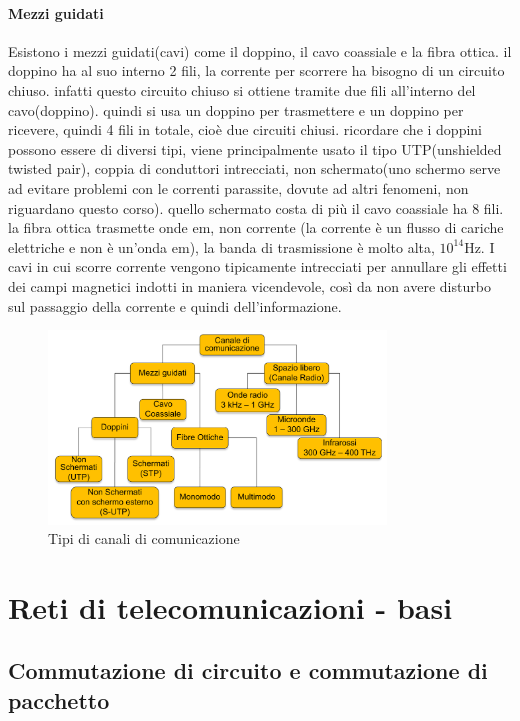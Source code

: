 \paragraph{Mezzi guidati}
Esistono i mezzi guidati(cavi) come il doppino, il cavo coassiale e la fibra ottica.
il doppino ha al suo interno 2 fili, la corrente per scorrere ha bisogno di un circuito chiuso. infatti questo circuito chiuso si ottiene tramite due fili all’interno del cavo(doppino).
quindi si usa un doppino per trasmettere e un doppino per ricevere, quindi 4 fili in totale, cioè due circuiti chiusi. ricordare che i doppini possono essere di diversi tipi, viene principalmente usato il tipo UTP(unshielded twisted pair), coppia di conduttori intrecciati, non schermato(uno schermo serve ad evitare problemi con le correnti parassite, dovute ad altri fenomeni, non riguardano questo corso). quello schermato costa di più
il cavo coassiale ha 8 fili.
la fibra ottica trasmette onde em, non corrente (la corrente è un flusso di cariche elettriche e non è un'onda em), la banda di trasmissione è molto alta, $10^{14}$Hz.
I cavi in cui scorre corrente vengono tipicamente intrecciati per annullare gli effetti dei campi magnetici indotti in maniera vicendevole, così da non avere disturbo sul passaggio della corrente e quindi dell'informazione.
\begin{figure}[h!]
    \centering
    \includegraphics[width=0.8\textwidth]{images/canali_comunicazione}
    \caption{Tipi di canali di comunicazione}
    \label{fig:canali_comunicazione}
\end{figure}
\newpage
\section{Reti di telecomunicazioni - basi}
\subsection{Commutazione di circuito e commutazione di pacchetto}
